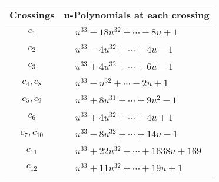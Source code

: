 \documentclass[1p]{elsarticle_modified}
\theoremstyle{definition}
\begin{document}
\begin{tabular}{m{50pt}|m{274pt}}
Crossings & \hspace{64pt}u-Polynomials at each crossing \\
\hline $$\begin{aligned}c_{1}\end{aligned}$$&$\begin{aligned}
&u^{33}-18 u^{32}+\cdots-8 u+1
\end{aligned}$\\
\hline $$\begin{aligned}c_{2}\end{aligned}$$&$\begin{aligned}
&u^{33}-4 u^{32}+\cdots+4 u-1
\end{aligned}$\\
\hline $$\begin{aligned}c_{3}\end{aligned}$$&$\begin{aligned}
&u^{33}+4 u^{32}+\cdots+6 u-1
\end{aligned}$\\
\hline $$\begin{aligned}c_{4},c_{8}\end{aligned}$$&$\begin{aligned}
&u^{33}- u^{32}+\cdots-2 u+1
\end{aligned}$\\
\hline $$\begin{aligned}c_{5},c_{9}\end{aligned}$$&$\begin{aligned}
&u^{33}+8 u^{31}+\cdots+9 u^2-1
\end{aligned}$\\
\hline $$\begin{aligned}c_{6}\end{aligned}$$&$\begin{aligned}
&u^{33}+4 u^{32}+\cdots+4 u+1
\end{aligned}$\\
\hline $$\begin{aligned}c_{7},c_{10}\end{aligned}$$&$\begin{aligned}
&u^{33}-8 u^{32}+\cdots+14 u-1
\end{aligned}$\\
\hline $$\begin{aligned}c_{11}\end{aligned}$$&$\begin{aligned}
&u^{33}+22 u^{32}+\cdots+1638 u+169
\end{aligned}$\\
\hline $$\begin{aligned}c_{12}\end{aligned}$$&$\begin{aligned}
&u^{33}+11 u^{32}+\cdots+19 u+1
\end{aligned}$\\
\hline
\end{tabular}\\~\\
\end{document}
